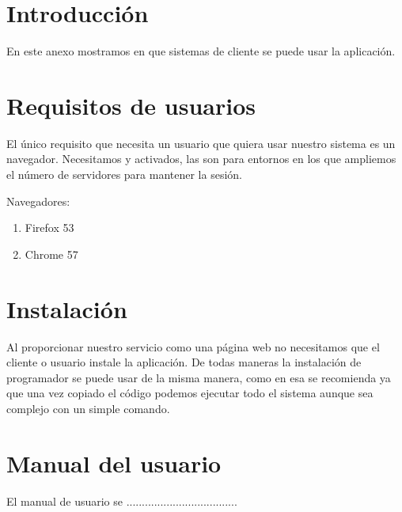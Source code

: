 
\section{Introducción}
En este anexo mostramos en que sistemas de cliente se puede usar la aplicación.

\section{Requisitos de usuarios}
El único requisito que necesita un usuario que quiera usar nuestro sistema es un navegador. Necesitamos  y  activados, las  son para entornos en los que ampliemos el número de servidores para mantener la sesión.

Navegadores:
\begin{enumerate}
\item Firefox 53
\item Chrome 57
\end{enumerate}


\section{Instalación}
Al proporcionar nuestro servicio como una página web no necesitamos que el cliente o usuario instale la aplicación. De todas maneras la instalación de programador se puede usar de la misma manera, como en esa se recomienda  ya que una vez copiado el código podemos ejecutar todo el sistema aunque sea complejo con un simple comando.

\section{Manual del usuario}
El manual de usuario se ....................................


